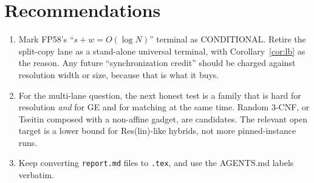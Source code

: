 \documentclass[11pt]{article}
\theoremstyle{definition}
\theoremstyle{remark}
\begin{document}
\section{Recommendations}
\begin{enumerate}
\item Mark FP58's ``$s+w=O(\log N)$'' terminal as CONDITIONAL. Retire the split-copy lane as
a stand-alone universal terminal, with Corollary~\ref{cor:lb} as the reason. Any future
``synchronization credit'' should be charged against resolution width or size, because that
is what it buys.
\item For the multi-lane question, the next honest test is a family that is hard for
resolution \emph{and} for GE and for matching at the same time. Random 3-CNF, or Tseitin
composed with a non-affine gadget, are candidates. The relevant open target is a lower bound
for Res(lin)-like hybrids, not more pinned-instance runs.
\item Keep converting \texttt{report.md} files to \texttt{.tex}, and use the AGENTS.md labels
verbatim.
\end{enumerate}

\appendix
\end{document}

